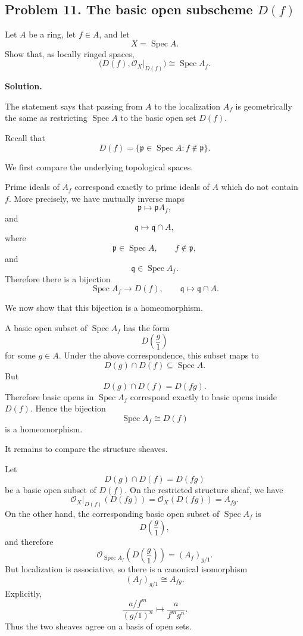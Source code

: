 
\subsection*{Problem 11. The basic open subscheme \(D(f)\)}

Let \(A\) be a ring, let \(f\in A\), and let
\[
X=\operatorname{Spec} A.
\]
Show that, as locally ringed spaces,
\[
\bigl(D(f),\mathcal O_X|_{D(f)}\bigr)\cong \operatorname{Spec} A_f .
\]

\textbf{Solution.}

The statement says that passing from \(A\) to the localization \(A_f\) is geometrically the same as restricting \(\operatorname{Spec} A\) to the basic open set \(D(f)\).

Recall that
\[
D(f)=\{\mathfrak p\in \operatorname{Spec} A : f\notin \mathfrak p\}.
\]

We first compare the underlying topological spaces.

Prime ideals of \(A_f\) correspond exactly to prime ideals of \(A\) which do not contain \(f\). More precisely, we have mutually inverse maps
\[
\mathfrak p \longmapsto \mathfrak pA_f,
\]
and
\[
\mathfrak q \longmapsto \mathfrak q\cap A,
\]
where
\[
\mathfrak p\in \operatorname{Spec} A,\qquad f\notin \mathfrak p,
\]
and
\[
\mathfrak q\in \operatorname{Spec} A_f.
\]
Therefore there is a bijection
\[
\operatorname{Spec} A_f \longrightarrow D(f),
\qquad
\mathfrak q\longmapsto \mathfrak q\cap A.
\]

We now show that this bijection is a homeomorphism.

A basic open subset of \(\operatorname{Spec} A_f\) has the form
\[
D\left(\frac g1\right)
\]
for some \(g\in A\). Under the above correspondence, this subset maps to
\[
D(g)\cap D(f)\subseteq \operatorname{Spec} A.
\]
But
\[
D(g)\cap D(f)=D(fg).
\]
Therefore basic opens in \(\operatorname{Spec} A_f\) correspond exactly to basic opens inside \(D(f)\). Hence the bijection
\[
\operatorname{Spec} A_f \cong D(f)
\]
is a homeomorphism.

It remains to compare the structure sheaves.

Let
\[
D(g)\cap D(f)=D(fg)
\]
be a basic open subset of \(D(f)\). On the restricted structure sheaf, we have
\[
\mathcal O_X|_{D(f)}(D(fg))
=
\mathcal O_X(D(fg))
=
A_{fg}.
\]
On the other hand, the corresponding basic open subset of \(\operatorname{Spec} A_f\) is
\[
D\left(\frac g1\right),
\]
and therefore
\[
\mathcal O_{\operatorname{Spec} A_f}\left(D\left(\frac g1\right)\right)
=
(A_f)_{g/1}.
\]
But localization is associative, so there is a canonical isomorphism
\[
(A_f)_{g/1}\cong A_{fg}.
\]
Explicitly,
\[
\frac{a/f^m}{(g/1)^n}
\longmapsto
\frac{a}{f^mg^n}.
\]
Thus the two sheaves agree on a basis of open sets.

